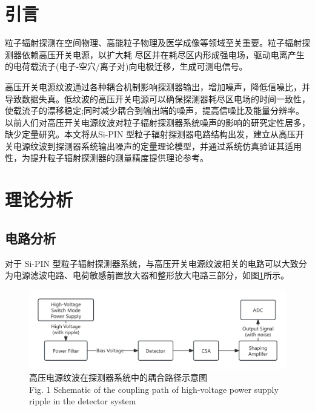 \documentclass{ctexart}
\begin{document}
\twocolumn

\section{引言}

粒子辐射探测在空间物理、高能粒子物理及医学成像等领域至关重要\cite{1, 2, 3}。粒子辐射探测器依赖高压开关电源，以扩大耗
尽区并在耗尽区内形成强电场，驱动电离产生的电荷载流子(电子-空穴/离子对)向电极迁移，生成可测电信号。

高压开关电源纹波通过各种耦合机制影响探测器输出，增加噪声，降低信噪比，并导致数据失真\cite{4}。低纹波的高压开关电源可以确保探测器耗尽区电场的时间一致性，使载流子的漂移稳定;同时减少耦合到输出端的噪声，提高信噪比及能量分辨率\cite{5}。以前人们对高压开关电源纹波对粒子辐射探测器系统噪声的影响的研究定性居多，缺少定量研究\cite{6, 7}。本文将从Si-PIN 型粒子辐射探测器电路结构出发，建立从高压开关电源纹波到探测器系统输出噪声的定量理论模型，并通过系统仿真验证其适用性，为提升粒子辐射探测器的测量精度提供理论参考。


\section{理论分析}

\subsection{电路分析}

对于 Si-PIN 型粒子辐射探测器系统，与高压开关电源纹波相关的电路可以大致分为电源滤波电路、电荷敏感前置放大器和整形放大电路三部分，如图\ref{fig:overall_system}所示。

\begin{figure}[!h]
    \centering
    \includegraphics[width=\linewidth]{./overall_system.png}
    \caption{高压电源纹波在探测器系统中的耦合路径示意图 \\ Fig. 1 Schematic of the coupling path of high-voltage power supply ripple in the detector system}
    \label{fig:overall_system}
\end{figure}
\end{document}

